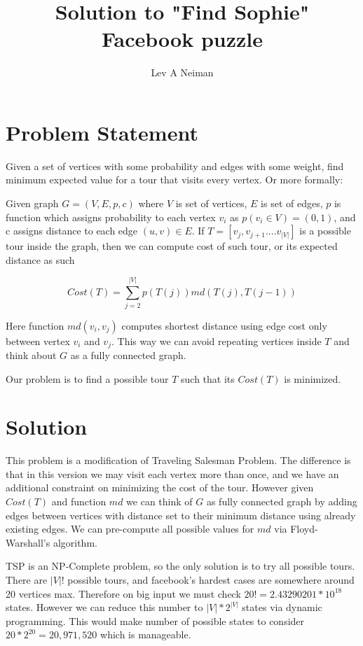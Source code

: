 \documentclass[11pt]{article}
\begin{document}
\title{Solution to "Find Sophie" Facebook puzzle\cite{findsophie}}
\author{Lev A Neiman}

\maketitle

\section{Problem Statement}

Given a set of vertices with some probability and edges with some weight, find minimum expected value for a tour that visits every vertex.  Or more formally:

Given graph $G=(V,E,p,c)$ where $V$ is set of vertices, $E$ is set of edges, $p$ is function which assigns probability to each vertex $v_{i}$ as $p(v_{i} \in V)=(0,1)$, and c assigns distance to each edge $(u,v)\in E$.  If $T=[v_{j},v_{j+1}....v_{|V|}]$ is a possible tour inside the graph, then we can compute cost of such tour, or its expected distance as such

$$Cost(T)=\sum_{j=2}^{|V|}p(T(j))md(T(j),T(j-1))$$

Here function $md(v_{i},v_{j})$ computes shortest distance using edge cost only between vertex $v_{i}$ and $v_{j}$.  This way we can avoid repeating vertices inside $T$ and think about $G$ as a fully connected graph.

Our problem is to find a possible tour $T$ such that its $Cost(T)$ is minimized.

\section{Solution}

This problem is a modification of Traveling Salesman Problem\cite{TSP}.  The difference is that in this version we may visit each vertex more than once, and we have an additional constraint on minimizing the cost of the tour.  However given $Cost(T)$ and function $md$ we can think of $G$ as fully connected graph by adding edges between vertices with distance set to their minimum distance using already existing edges.  We can pre-compute all possible values for $md$ via Floyd-Warshall's\cite{floyd} algorithm.

TSP is an NP-Complete problem, so the only solution is to try all possible tours.  There are $|V|!$ possible tours, and facebook's hardest cases are somewhere around 20 vertices max.  Therefore on big input we must check $20!=2.43290201*10^{18}$ states.  However we can reduce this number to $|V|*2^{|V|}$ states via dynamic programming.  This would make number of possible states to consider $20*2^{20}=20,971,520$ which is manageable.
\end{document}
